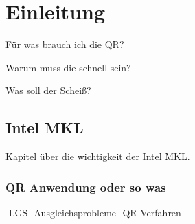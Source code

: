 \chapter{Einleitung}

Für was brauch ich die QR?

Warum muss die schnell sein?

Was soll der Scheiß?

\section{Intel MKL}

Kapitel über die wichtigkeit der Intel MKL.

\subsection{QR Anwendung oder so was}
-LGS 
-Ausgleichsprobleme 
-QR-Verfahren 
